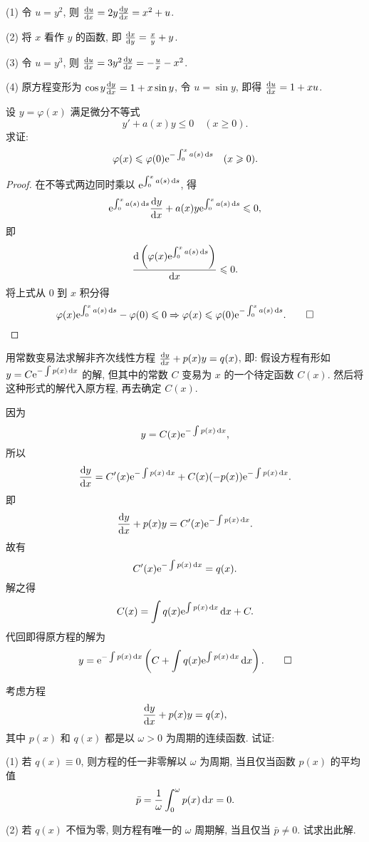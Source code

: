 \begin{solution}
  (1) 令 $u=y^2$, 则 $\frac{\mathop{}\!\mathrm{d} u}{\mathop{}\!\mathrm{d} x}=2y\frac{\mathop{}\!\mathrm{d} y}{\mathop{}\!\mathrm{d} x}=x^2+u$.

  (2) 将 $x$ 看作 $y$ 的函数, 即 $\frac{\mathop{}\!\mathrm{d} x}{\mathop{}\!\mathrm{d} y}=\frac{x}{y}+y$.

  (3) 令 $u=y^3$, 则 $\frac{\mathop{}\!\mathrm{d} u}{\mathop{}\!\mathrm{d} x}=3y^2\frac{\mathop{}\!\mathrm{d} y}{\mathop{}\!\mathrm{d} x}=-\frac{u}{x}-x^2$.

  (4) 原方程变形为 $\cos y\frac{\mathop{}\!\mathrm{d} y}{\mathop{}\!\mathrm{d} x}=1+x\sin y$,
  令 $u=\sin y$, 即得 $\frac{\mathop{}\!\mathrm{d} u}{\mathop{}\!\mathrm{d} x}=1+xu$.
\end{solution}



\begin{exercise}
  设 $y=\varphi(x)$ 满足微分不等式
  \[y'+a(x)y\leq 0\quad (x\geq 0).\]
  求证:
  \[\varphi(x)\leqslant\varphi(0)\mathrm{e}^{-\int_0^x a(s)\mathop{}\!\mathrm{d} s}\quad (x\geqslant 0).\]
\end{exercise}

\begin{proof} 
在不等式两边同时乘以 $\mathrm{e}^{\int_0^xa(s)\mathop{}\!\mathrm{d} s}$, 得
\[\mathrm{e}^{\int_0^xa(s)\mathop{}\!\mathrm{d} s}\frac{\mathop{}\!\mathrm{d} y}{\mathop{}\!\mathrm{d} x}+a(x)y\mathrm{e}^{\int_0^xa(s)\mathop{}\!\mathrm{d} s}\leqslant 0,\]
即
\[\frac{\mathop{}\!\mathrm{d}\left(\varphi(x)\mathrm{e}^{\int_0^xa(s)\mathop{}\!\mathrm{d} s}\right)}{\mathop{}\!\mathrm{d} x}\leqslant 0.\]
将上式从 $0$ 到 $x$ 积分得
\[\varphi(x)\mathrm{e}^{\int_0^xa(s)\mathop{}\!\mathrm{d} s}-\varphi(0)\leqslant 0
\Rightarrow\varphi(x)\leqslant\varphi(0)\mathrm{e}^{-\int_0^xa(s)\mathop{}\!\mathrm{d} s}.\qedhere\]
\end{proof}



\begin{exercise}
  用常数变易法求解非齐次线性方程 $\frac{\mathop{}\!\mathrm{d} y}{\mathop{}\!\mathrm{d} x}+p(x)y=q(x)$, 即: 
  假设方程有形如 $y=C\mathrm{e}^{-\int p(x)\mathop{}\!\mathrm{d} x}$ 的解, 但其中的常数 $C$ 变易为 $x$ 的一个待定函数 $C(x)$. 
  然后将这种形式的解代入原方程, 再去确定 $C(x)$.
\end{exercise}

\begin{solution}
因为
\[y=C(x)\mathrm{e}^{-\int p(x)\mathop{}\!\mathrm{d} x},\]
所以
\[\frac{\mathop{}\!\mathrm{d} y}{\mathop{}\!\mathrm{d} x}=C'(x)\mathrm{e}^{-\int p(x)\mathop{}\!\mathrm{d} x}+C(x)(-p(x))\mathrm{e}^{-\int p(x)\mathop{}\!\mathrm{d} x}.\]
即
\[\frac{\mathop{}\!\mathrm{d} y}{\mathop{}\!\mathrm{d} x}+p(x)y=C'(x)\mathrm{e}^{-\int p(x)\mathop{}\!\mathrm{d} x}.\]
故有
\[C'(x)\mathrm{e}^{-\int p(x)\mathop{}\!\mathrm{d} x} = q(x).\]
解之得
\[C(x)=\int q(x)\mathrm{e}^{\int p(x)\mathop{}\!\mathrm{d} x}\mathop{}\!\mathrm{d} x+C.\]
代回即得原方程的解为
\[y=\mathrm{e}^{-\int p(x)\mathop{}\!\mathrm{d} x}\left(C+\int q(x)\mathrm{e}^{\int p(x)\mathop{}\!\mathrm{d} x}\mathop{}\!\mathrm{d} x\right).\qedhere\]
\end{solution}



\begin{exercise}
  考虑方程
  \[\frac{\mathop{}\!\mathrm{d} y}{\mathop{}\!\mathrm{d} x}+p(x)y=q(x),\]
  其中 $p(x)$ 和 $q(x)$ 都是以 $\omega>0$ 为周期的连续函数. 试证:

  (1) 若 $q(x)\equiv 0$, 则方程的任一非零解以 $\omega$ 为周期, 当且仅当函数 $p(x)$ 的平均值
  \[\bar{p}=\frac{1}{\omega}\int_0^{\omega}p(x)\mathop{}\!\mathrm{d} x=0.\]

  (2) 若 $q(x)$ 不恒为零, 则方程有唯一的 $\omega$ 周期解, 当且仅当 $\bar{p}\neq0$. 试求出此解.
\end{exercise}


